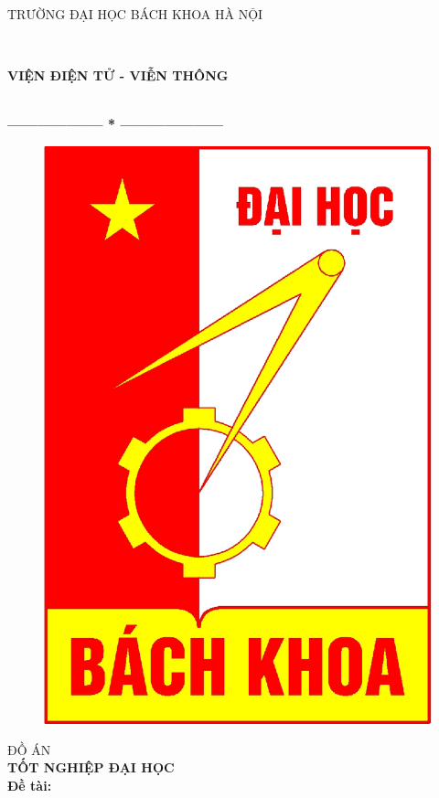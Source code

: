 \thispagestyle{empty}
\thisfancypage{
\setlength{\fboxsep}{0pt}
\fbox}{} 
\begin{center}
\begin{large}
TRƯỜNG ĐẠI HỌC BÁCH KHOA HÀ NỘI
\end{large}\\ \vspace{0.2cm}
\begin{large}
\textbf{VIỆN ĐIỆN TỬ - VIỄN THÔNG}
\end{large} \\
\textbf{--------------------  *  ---------------------}\\[0.5cm]
\begin{figure}[h!]
		\centering
		\includegraphics[width=0.18\linewidth]{image/logobk}
\end{figure}
 \vspace{1cm}

{\fontsize{18pt}{1} \textsc{ĐỒ ÁN}}\\ %
\vspace{0.5cm}
{\fontsize{24pt}{1} \textbf{TỐT NGHIỆP ĐẠI HỌC}}\\[2cm] %
\flushleft \hspace{0.1cm} \fontsize{12pt}{1} \textbf{Đề tài:\\}
\vspace{0.3cm}
\end{center}
\vspace{2cm}
